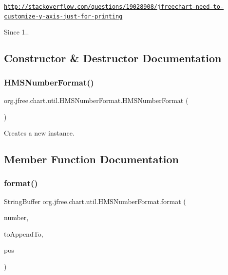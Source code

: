 \href{http://stackoverflow.com/questions/19028908/jfreechart-need-to-customize-y-axis-just-for-printing}{\tt http\+://stackoverflow.\+com/questions/19028908/jfreechart-\/need-\/to-\/customize-\/y-\/axis-\/just-\/for-\/printing}

\begin{DoxySince}{Since}
1.. 
\end{DoxySince}


\subsection{Constructor \& Destructor Documentation}
\mbox{\label{classorg_1_1jfree_1_1chart_1_1util_1_1_h_m_s_number_format_aaf45038815e15733bf3c0b0e59c11863}} 
\subsubsection{\texorpdfstring{H\+M\+S\+Number\+Format()}{HMSNumberFormat()}}
{\footnotesize\ttfamily org.\+jfree.\+chart.\+util.\+H\+M\+S\+Number\+Format.\+H\+M\+S\+Number\+Format (\begin{DoxyParamCaption}{ }\end{DoxyParamCaption})}

Creates a new instance. 

\subsection{Member Function Documentation}
\mbox{\label{classorg_1_1jfree_1_1chart_1_1util_1_1_h_m_s_number_format_a258ffdf599b7783276062a339fba0bfd}} 
\subsubsection{\texorpdfstring{format()}{format()}\hspace{0.1cm}{\footnotesize\ttfamily [1/2]}}
{\footnotesize\ttfamily String\+Buffer org.\+jfree.\+chart.\+util.\+H\+M\+S\+Number\+Format.\+format (\begin{DoxyParamCaption}\item[{double}]{number,  }\item[{String\+Buffer}]{to\+Append\+To,  }\item[{Field\+Position}]{pos }\end{DoxyParamCaption})}

